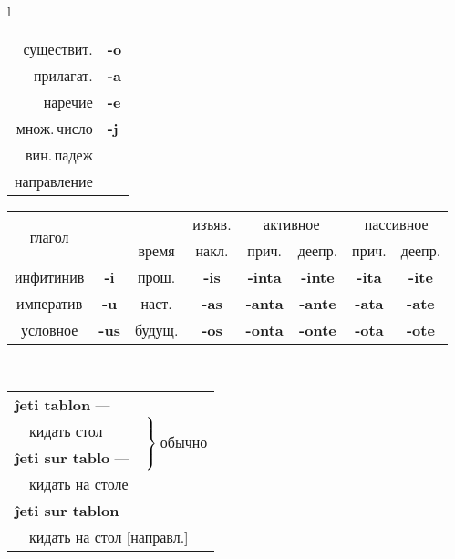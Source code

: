 \documentclass{article}
\def\b#1{\textbf{#1}}
\def\g{\cellcolor{gray!25}}
\begin{document}
\begin{center}
\begin{tabular}{l}
\begin{tabular}{|r>{\bfseries}l|}
\hline
существит. & -o \\
прилагат. & -a \\
наречие & -e \\
множ.\,число & -j \\
\vspace*{-0.3em}вин.\,падеж & \multirow{2}{*}{\vspace*{0.3em}-n} \\
направление & \\
\hline
\end{tabular}
\quad
\begin{tabular}{|cc|c|c|c|c|c|c|}
\hline
\multirow{2}{*}{глагол} & &\g &\g изъяв. &\multicolumn{2}{c|}{\g активное} & \multicolumn{2}{c|}{\g пассивное} \\
\cline{5-8}
& & \g время & \g накл. & \g прич. & \g деепр. & \g прич. & \g деепр. \\
\hline
инфитинив & \b{-i} & \g прош. & \b{-is} & \b{-inta} & \b{-inte} & \b{-ita} & \b{-ite} \\
\cline{3-8}
императив & \b{-u} & \g наст. & \b{-as} & \b{-anta} & \b{-ante} & \b{-ata} & \b{-ate} \\
\cline{3-8}
условное & \b{-us} & \g будущ. & \b{-os} & \b{-onta} & \b{-onte} & \b{-ota} & \b{-ote} \\
\hline
\end{tabular}
\,
\begin{tabular}{ll}
\b{ĵeti tablon} ---\vspace*{-0.3em} &
\multirow{4}{*}{\hspace{-0.75em}\vspace*{1em}$\left. \rule{0pt}{2.3em} \right\}$\,обычно}\\
~~кидать стол\\
\b{ĵeti sur tablo} ---\vspace*{-0.3em}\\
~~кидать на столе\\
\multicolumn{2}{l}{\b{ĵeti sur tablon} ---}\vspace*{-0.3em}\\
\multicolumn{2}{l}{~~кидать на стол [направл.]}\\
\end{tabular}
\vspace{0.2em}\\


\end{tabular}
\end{center}
\end{document}
